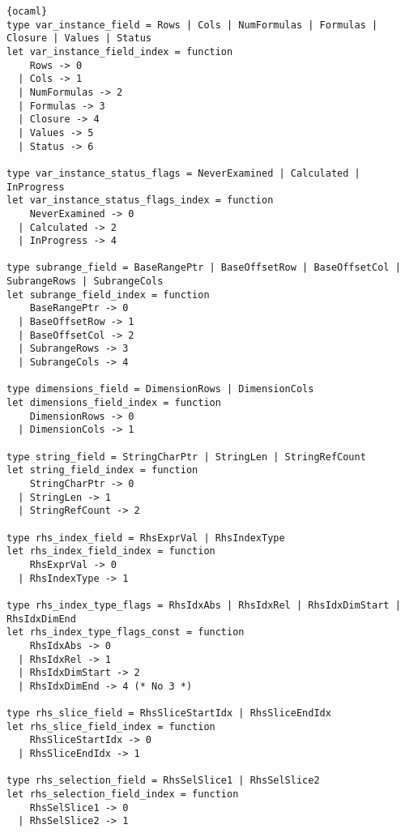 \begin{lstlisting}{ocaml}
type var_instance_field = Rows | Cols | NumFormulas | Formulas | Closure | Values | Status
let var_instance_field_index = function
    Rows -> 0
  | Cols -> 1
  | NumFormulas -> 2
  | Formulas -> 3
  | Closure -> 4
  | Values -> 5
  | Status -> 6

type var_instance_status_flags = NeverExamined | Calculated | InProgress
let var_instance_status_flags_index = function
    NeverExamined -> 0
  | Calculated -> 2
  | InProgress -> 4

type subrange_field = BaseRangePtr | BaseOffsetRow | BaseOffsetCol | SubrangeRows | SubrangeCols
let subrange_field_index = function
    BaseRangePtr -> 0
  | BaseOffsetRow -> 1
  | BaseOffsetCol -> 2
  | SubrangeRows -> 3
  | SubrangeCols -> 4

type dimensions_field = DimensionRows | DimensionCols
let dimensions_field_index = function
    DimensionRows -> 0
  | DimensionCols -> 1

type string_field = StringCharPtr | StringLen | StringRefCount
let string_field_index = function
    StringCharPtr -> 0
  | StringLen -> 1
  | StringRefCount -> 2

type rhs_index_field = RhsExprVal | RhsIndexType
let rhs_index_field_index = function
    RhsExprVal -> 0
  | RhsIndexType -> 1

type rhs_index_type_flags = RhsIdxAbs | RhsIdxRel | RhsIdxDimStart | RhsIdxDimEnd
let rhs_index_type_flags_const = function
    RhsIdxAbs -> 0
  | RhsIdxRel -> 1
  | RhsIdxDimStart -> 2
  | RhsIdxDimEnd -> 4 (* No 3 *)

type rhs_slice_field = RhsSliceStartIdx | RhsSliceEndIdx
let rhs_slice_field_index = function
    RhsSliceStartIdx -> 0
  | RhsSliceEndIdx -> 1

type rhs_selection_field = RhsSelSlice1 | RhsSelSlice2
let rhs_selection_field_index = function
    RhsSelSlice1 -> 0
  | RhsSelSlice2 -> 1


\end{lstlisting}

